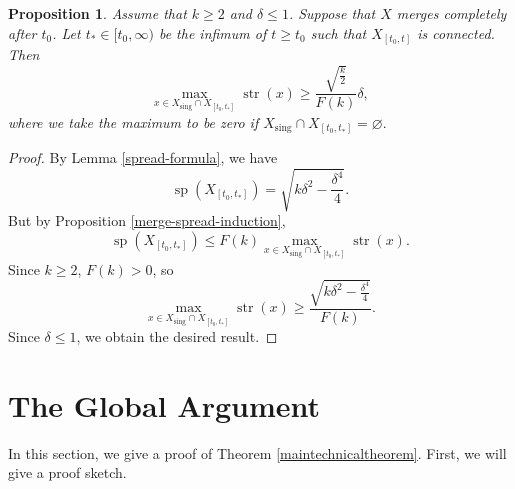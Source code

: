 \documentclass[11pt,reqno,twoside]{amsart}
\newcommand{\sing}{\mathrm{sing}}
\DeclareMathOperator{\spread}{\mathrm{sp}}
\DeclareMathOperator{\strength}{\mathrm{str}}
\newtheorem{proposition}[lemma]{Proposition}
\theoremstyle{definition}
\begin{document}
\begin{proposition} \label{find-strong-singular-point}
    Assume that $k \geq 2$ and $\delta \leq 1$. Suppose that $X$ merges completely after $t_0$. Let $t_* \in [t_0, \infty)$ be the infimum of $t \geq t_0$ such that $X_{[t_0,t]}$ is connected. Then
    \[\max_{x \in X_\sing \cap X_{[t_0,t_*]}} \strength(x) \geq \frac{\sqrt{\frac{k}{2}}}{F(k)} \delta,\]
    where we take the maximum to be zero if $X_\sing \cap X_{[t_0,t_*]} = \varnothing.$
\end{proposition}
\begin{proof}
    By Lemma \ref{spread-formula}, we have
    \[\spread(X_{[t_0,t_*]}) = \sqrt{k\delta^2 - \frac{\delta^4}{4}}.\]
    But by Proposition \ref{merge-spread-induction}, 
    \[\spread(X_{[t_0,t_*]}) \leq F(k) \max_{x \in X_\sing \cap X_{[t_0,t_*]}} \strength(x).\]
    Since $k \geq 2$, $F(k) > 0$, so
    \[ \max_{x \in X_\sing \cap X_{[t_0,t_*]}} \strength(x) \geq \frac{\sqrt{k\delta^2 - \frac{\delta^4}{4}}}{F(k)}.\]
    Since $\delta \leq 1$, we obtain the desired result.
\end{proof}

\section{The Global Argument}
\label{sec:globalargument}

In this section, we give a proof of Theorem \ref{maintechnicaltheorem}. First, we will give a proof sketch. 
\end{document}
